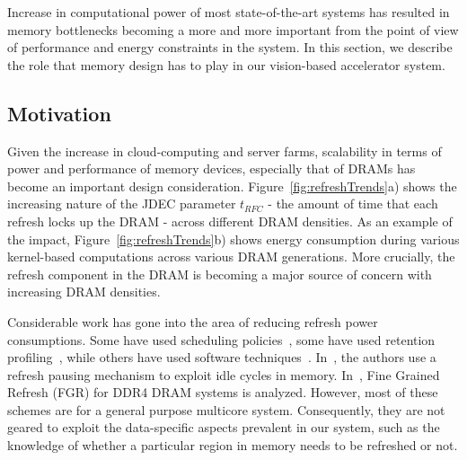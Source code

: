 Increase in computational power of most state-of-the-art systems has resulted in memory bottlenecks becoming a more and more important from the point of view of performance and energy constraints in the system.
In this section, we describe the role that memory design has to play in our vision-based accelerator system.

\subsection{Motivation}
Given the increase in cloud-computing and server farms, scalability in terms of power and performance of memory devices, especially that of DRAMs has become an important design consideration. %
Figure~\ref{fig:refreshTrends}a) shows the increasing nature of the JDEC parameter $t_{RFC}$ - the amount of time that each refresh locks up the DRAM - across different DRAM densities. As an example of the impact, Figure~\ref{fig:refreshTrends}b) shows energy consumption during various kernel-based computations across various DRAM generations. More crucially, the refresh component in the DRAM is becoming a major source of concern with increasing DRAM densities.

 
Considerable work has gone into the area of reducing refresh power consumptions. Some have used scheduling policies~\cite{Stuecheli2010}, some have used retention profiling~\cite{Liu2012}, while others have used software techniques~\cite{Liu2012}. In~\cite{Nair2013}, the authors use a refresh pausing mechanism to exploit idle cycles in memory. In~\cite{Mukundan2013}, Fine Grained Refresh (FGR) for DDR4 DRAM systems is analyzed. 
However, most of these schemes are for a general purpose multicore system. Consequently, they are not geared to exploit the data-specific aspects prevalent in our system, such as the knowledge of whether a particular region in memory needs to be refreshed or not.


